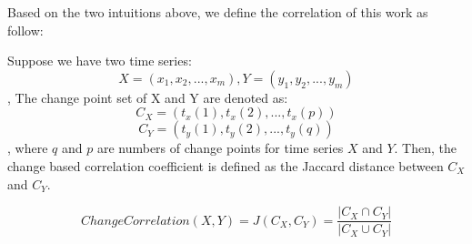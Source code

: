 Based on the two intuitions above, we define the correlation of this work as follow:
\begin{definition} 
\label{def:changeCorrelaion}
Suppose we have two time series: 
\[X=(x_1,x_2,...,x_m),Y=(y_1,y_2,...,y_m)\], 
The change point set of X and Y are denoted as: 
\[C_X=(t_x(1),t_x(2),...,t_x(p))\]
\[C_Y=(t_y(1),t_y(2),...,t_y(q))\],
where $q$ and $p$ are numbers of change points for time series $X$ and $Y$.
Then, the change based correlation coefficient is defined as the Jaccard distance \cite{han2011data} between $C_X$ and $C_Y$.

\begin{equation}
ChangeCorrelation(X,Y) = J(C_X,C_Y)=\frac{|C_X \cap C_Y|}{|C_X \cup C_Y|}
\end{equation}

\end{definition}